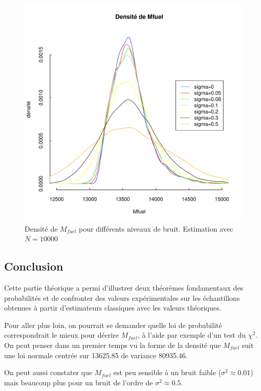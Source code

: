 \documentclass{article}
\begin{document}
\begin{figure}[!h]
\begin{center}
    \includegraphics[scale=0.7]{histo_Mfuel_b.pdf}
    \caption{Densité de $M_{fuel}$ pour différents niveaux de bruit. Estimation avec $N=10000$}
    \label{histo_M_b}
\end{center}
\end{figure}
\subsection{Conclusion}
Cette partie théorique a permi d'illustrer deux théorèmes fondamentaux des probabilités et de confronter des valeurs expérimentales sur les échantillons obtenues à partir d'estimateurs classiques avec les valeurs théoriques. 

Pour aller plus loin, on pourrait se demander quelle loi de probabilité correspondrait le mieux pour décrire $M_{fuel}$, à l'aide par exemple d'un test du $\chi^{2}$. On peut penser dans un premier temps vu la forme de la densité que $M_{fuel}$ suit une loi normale centrée sur 13625.85 de variance 80935.46.

On peut aussi constater que $M_{fuel}$ est peu sensible à un bruit faible ($\sigma^2\approx 0.01$) mais beaucoup plus pour un bruit de l'ordre de $\sigma^2\approx 0.5$.
\end{document}
